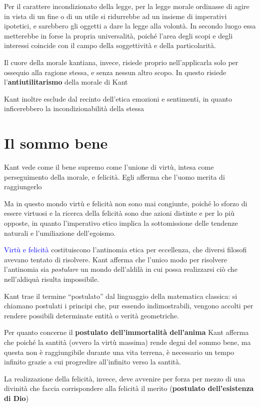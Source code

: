 \documentclass[a4paper, twoside, titlepage]{book}
\renewcommand{\emph}[1]{\textcolor{blue}{#1}}
\begin{document}
Per il carattere incondizionato della legge, per la legge morale ordinasse di agire in vista di un fine o di un utile si ridurrebbe ad un insieme di imperativi ipotetici, e sarebbero gli oggetti a dare la legge alla volontà. In secondo luogo essa metterebbe in forse la propria universalità, poiché l’area degli scopi e degli interessi coincide con il campo della soggettività e della particolarità.

Il cuore della morale kantiana, invece, risiede proprio nell’applicarla solo per ossequio alla ragione stessa, e senza nessun altro scopo. In questo risiede l’\textbf{antiutilitarismo} della morale di Kant

Kant inoltre esclude dal recinto dell’etica emozioni e sentimenti, in quanto inficerebbero la incondizionabilità della stessa

\section{Il sommo bene}

Kant vede come il bene supremo come l’unione di virtù, intesa come perseguimento della morale, e felicità. Egli afferma che l’uomo merita di raggiungerlo

Ma in questo mondo virtù e felicità non sono mai congiunte, poiché lo sforzo di essere virtuosi e la ricerca della felicità sono due azioni distinte e per lo più opposte, in quanto l’imperativo etico implica la sottomissione delle tendenze naturali e l’umiliazione dell’egoismo.

\emph{Virtù e felicità} costituiscono l’antinomia etica per eccellenza, che diversi filosofi avevano tentato di risolvere. Kant afferma che l’unico modo per risolvere l’antinomia sia \textit{postulare} un mondo dell’aldilà in cui possa realizzarsi ciò che nell’aldiquà risulta impossibile.

Kant trae il termine “postulato” dal linguaggio della matematica classica: si chiamano postulati i principi che, pur essendo indimostrabili, vengono accolti per rendere possibili determinate entità o verità geometriche.

Per quanto concerne il \textbf{postulato dell’immortalità dell’anima} Kant afferma che poiché la santità (ovvero la virtù massima) rende degni del sommo bene, ma questa non è raggiungibile durante una vita terrena, è necessario un tempo infinito grazie a cui progredire all’infinito verso la santità.

La realizzazione della felicità, invece, deve avvenire per forza per mezzo di una divinità che faccia corrispondere alla felicità il merito (\textbf{postulato dell’esistenza di Dio})
\end{document}
